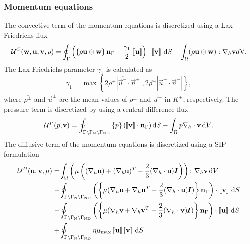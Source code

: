 \subsubsection{Momentum equations}
The convective term of the momentum equations is discretized using a Lax-Friedrichs flux
\begin{equation}
	\mathcal{U}^C(\textbf{w},\textbf{u},\textbf{v}, \rho)=  \oint_{\Gamma}{\left( \left\{{\rho\textbf{u}\otimes\textbf{w} }\right\}\textbf{n}_\Gamma + \frac{\gamma_1}{2}\left[\!\left[{{\textbf{u}}}\right]\!\right]\right)\cdot\left[\!\left[{{\textbf{v}}}\right]\!\right] \,\mathrm{d} S}
	-\int_{\Omega}({\rho\textbf{u}\otimes\textbf{w}}):\nabla_h\textbf{v} d\text{V}.
	\label{eq:Mom_convective}\\
\end{equation}
The Lax-Friedrichs parameter $\gamma_1$ is calculated as \textcite{kleinHighorderDiscontinuousGalerkin2016}
\begin{equation}
	\gamma_1  = \max \left\{2 \overline{\rho^+} |\overline{\vec{u}^+} \cdot \vec{n}^+|,2 \overline{\rho^-} |\overline{\vec{u}^-} \cdot \vec{n}^-|\right\},
	\label{eq:vardens_lambda}
\end{equation}
where $\overline{\rho^\pm}$ and $\overline{\vec{u}^\pm}$ are the mean values of $\rho^\pm$ and $\vec{u}^\pm$ in $K^\pm$, respectively. %
The pressure term is discretized by using a central difference flux
\begin{equation}
	\mathcal{U}^P(p,\textbf{v})=  \oint_{\Gamma \setminus \Gamma_{\text{N}}\setminus \Gamma_{\text{ND}}}{ \left\{{p}\right\}(\left[\!\left[{{\textbf{v}}}\right]\!\right]\cdot \textbf{n}_\Gamma  )\,\mathrm{d} S}
	- \int_{\Omega}{p \nabla_h \cdot \textbf{v} \,\mathrm{d} V}. \label{eq:Mom_pressure}
\end{equation}
The diffusive term of the momentum equations is discretized using a \gls{SIP} formulation \parencite{shahbaziExplicitExpressionPenalty2005}
\begin{equation}
	\begin{aligned}
		\tilde{\mathcal{U}}^D(\vec{u},\vec{v},\mu) =
		  & \int_{\Omega}{\left(\mu\left((\nabla_h \vec{u}) + (\nabla_h \vec{u})^T - \frac{2}{3}(\nabla_h\cdot \vec{u})\mytensor{I} \right)\right)\colon \nabla_h\vec{v}} \dV \\
		- & \oint_{\Gamma \setminus \Gamma_{\text{N}}\setminus \Gamma_{\text{ND}}}
		\left(\mean{\mu(\nabla_h\vec{u} + \nabla_h\vec{u}^T - \frac{2}{3}(\nabla_h\cdot \vec{u})\mytensor{I})}\normalBoundary\right)\cdot\jump{\vec{v}}\dS                    \\
		- & \oint_{\Gamma \setminus \Gamma_{\text{N}}\setminus \Gamma_{\text{ND}}}
		\left(\mean{\mu(\nabla_h\vec{v} + \nabla_h\vec{v}^T - \frac{2}{3}(\nabla_h\cdot \vec{v})\mytensor{I})}\normalBoundary\right)\cdot\jump{\vec{u}} \dS                   \\
		+ & \oint_{\Gamma \setminus \Gamma_{\text{N}}\setminus \Gamma_{\text{ND}}} \eta \mu_{\text{max}} \jump{\vec{u}} \jump{\vec{v}}\dS.
		\label{eq:Mom_diffusive}
	\end{aligned}
\end{equation}
